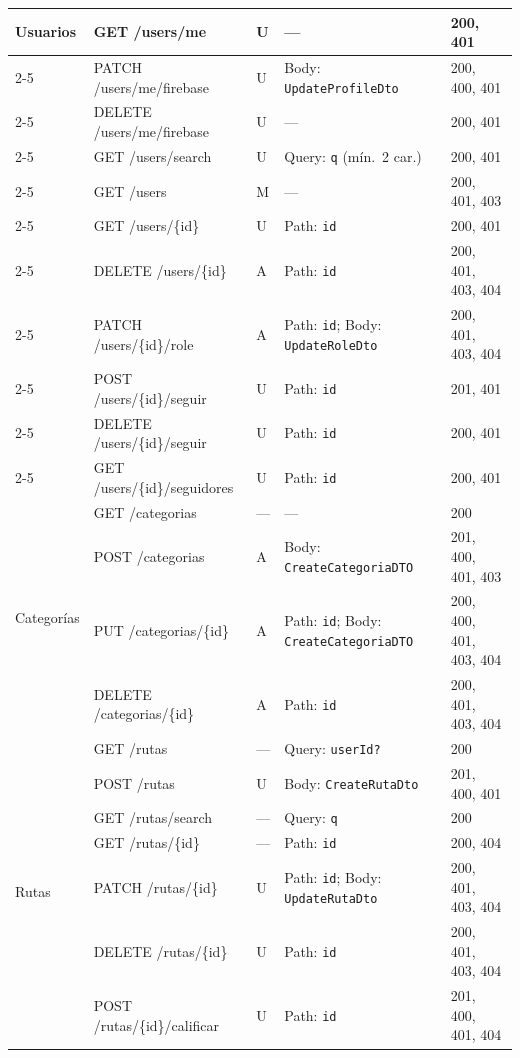 \begin{longtable}{|p{1.5cm}|p{3.6cm}|p{0.8cm}|p{4cm}|p{2.8cm}|}
\multirow{11}{=}{Usuarios}
 & GET /users/me & U & — & 200, 401 \\
\cline{2-5}
 & PATCH /users/me/firebase & U & Body: \texttt{UpdateProfileDto} & 200, 400, 401 \\
\cline{2-5}
 & DELETE /users/me/firebase & U & — & 200, 401 \\
\cline{2-5}
 & GET /users/search & U & Query: \texttt{q} (mín.\ 2 car.) & 200, 401 \\
\cline{2-5}
 & GET /users & M & — & 200, 401, 403 \\
\cline{2-5}
 & GET /users/\{id\} & U & Path: \texttt{id} & 200, 401 \\
\cline{2-5}
 & DELETE /users/\{id\} & A & Path: \texttt{id} & 200, 401, 403, 404 \\
\cline{2-5}
 & PATCH /users/\{id\}/role & A & Path: \texttt{id}; Body: \texttt{UpdateRoleDto} & 200, 401, 403, 404 \\
\cline{2-5}
 & POST /users/\{id\}/seguir & U & Path: \texttt{id} & 201, 401 \\
\cline{2-5}
 & DELETE /users/\{id\}/seguir & U & Path: \texttt{id} & 200, 401 \\
\cline{2-5}
 & GET /users/\{id\}/seguidores & U & Path: \texttt{id} & 200, 401 \\
\hline

\multirow{4}{=}{Categorías}
 & GET /categorias & — & — & 200 \\
\cline{2-5}
 & POST /categorias & A & Body: \texttt{CreateCategoriaDTO} & 201, 400, 401, 403 \\
\cline{2-5}
 & PUT /categorias/\{id\} & A & Path: \texttt{id}; Body: \texttt{CreateCategoriaDTO} & 200, 400, 401, 403, 404 \\
\cline{2-5}
 & DELETE /categorias/\{id\} & A & Path: \texttt{id} & 200, 401, 403, 404 \\
\hline

\multirow{7}{=}{Rutas}
 & GET /rutas & — & Query: \texttt{userId?} & 200 \\
\cline{2-5}
 & POST /rutas & U & Body: \texttt{CreateRutaDto} & 201, 400, 401 \\
\cline{2-5}
 & GET /rutas/search & — & Query: \texttt{q} & 200 \\
\cline{2-5}
 & GET /rutas/\{id\} & — & Path: \texttt{id} & 200, 404 \\
\cline{2-5}
 & PATCH /rutas/\{id\} & U & Path: \texttt{id}; Body: \texttt{UpdateRutaDto} & 200, 401, 403, 404 \\
\cline{2-5}
 & DELETE /rutas/\{id\} & U & Path: \texttt{id} & 200, 401, 403, 404 \\
\cline{2-5}
 & POST /rutas/\{id\}/calificar & U & Path: \texttt{id} & 201, 400, 401, 404 \\
\hline


\end{longtable}
